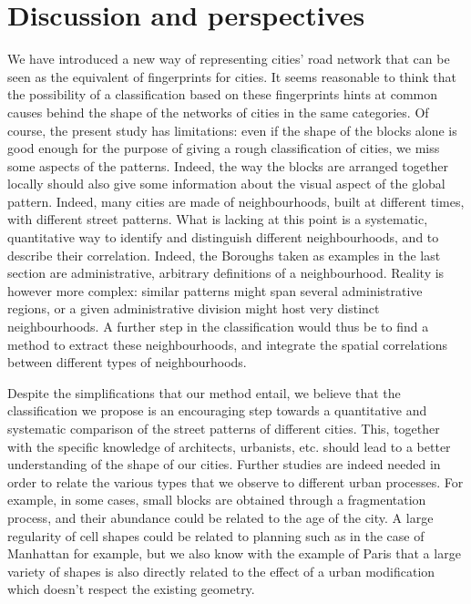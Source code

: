 \section{Discussion and perspectives}

We have introduced a new way of representing cities' road network that can be
seen as the equivalent of fingerprints for cities. It seems reasonable to think
that the possibility of a classification based on these fingerprints hints at
common causes behind the shape of the networks of cities in the same categories.
Of course, the present study has limitations: even if the shape of the blocks
alone is good enough for the purpose of giving a rough classification of cities,
we miss some aspects of the patterns. Indeed, the way the blocks are arranged
together locally should also give some information about the visual aspect of
the global pattern. Indeed, many cities are made of neighbourhoods, built at
different times, with different street patterns. What is lacking at this point
is a systematic, quantitative way to identify and distinguish different
neighbourhoods, and to describe their correlation. Indeed, the Boroughs taken as
examples in the last section are administrative, arbitrary definitions of a
neighbourhood. Reality is however more complex: similar patterns might span
several administrative regions, or a given administrative division might host
very distinct neighbourhoods. A further step in the classification would thus be
to find a method to extract these neighbourhoods, and integrate the spatial
correlations between different types of neighbourhoods.

Despite the simplifications that our method entail, we believe that the
classification we propose is an encouraging step towards a quantitative and
systematic comparison of the street patterns of different cities. This, together
with the specific knowledge of architects, urbanists, etc. should lead to a
better understanding of the shape of our cities. Further studies are indeed
needed in order to relate the various types that we observe to different urban
processes. For example, in some cases, small blocks are obtained through a
fragmentation process, and their abundance could be related to the age of the
city. A large regularity of cell shapes could be related to planning such as in
the case of Manhattan for example, but we also know with the example of Paris
\cite{Barthelemy:2013} that a large variety of shapes is also directly related
to the effect of a urban modification which doesn't respect the existing
geometry.\\

